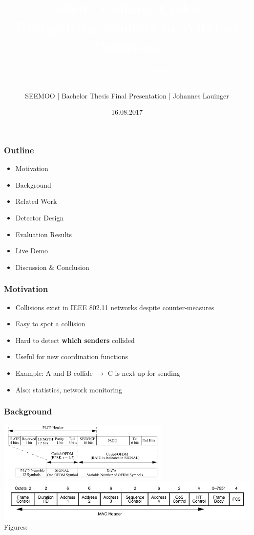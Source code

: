 \documentclass[accentcolor=tud8b,colorbacktitle]{tudbeamer}
\title{\textcolor{white}{Collide, Collate, Collect: Recognizing Senders in Wireless Collisions\\}}
\subtitle{\textcolor{white}{B.Sc. Thesis Final Presentation\\Johannes Lauinger}}
\author{SEEMOO | Bachelor Thesis Final Presentation | Johannes Lauinger}
\date{16.08.2017}
\begin{document}
\begin{titleframe}
\end{titleframe}


\begin{frame}
\frametitle{Outline}
\begin{itemize}
	\setlength\itemsep{1em}
	\item Motivation
	\item Background
	\item Related Work
	\item Detector Design
	\item Evaluation Results
	\item Live Demo
	\item Discussion \& Conclusion
\end{itemize}
\end{frame}


\begin{frame}
\frametitle{Motivation}
\begin{itemize}
	\setlength\itemsep{1em}
	\item Collisions exist in IEEE 802.11 networks despite counter-measures
	\item Easy to spot a collision
	\item Hard to detect \textbf{which senders} collided \cite{choi2013, keene2010}
	\item Useful for new coordination functions
	\item Example: A and B collide $\rightarrow$ C is next up for sending
	\item Also: statistics, network monitoring
\end{itemize}
\end{frame}


\begin{frame}
\frametitle{Background}
\begin{centering}
	\includegraphics[width=8.5cm]{assets/phy-format}\\
	\vspace{0.3cm}
	\includegraphics[width=\textwidth]{assets/mac-format}\\
	\small Figures: \cite{ieee2012} \normalsize\\~\\
\end{centering}
\end{frame}
\end{document}
